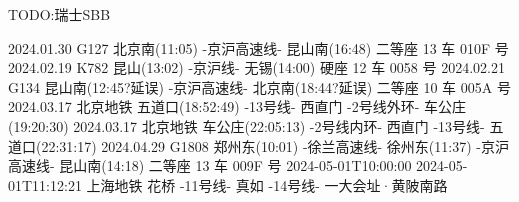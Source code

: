 TODO:瑞士SBB

2024.01.30 G127  北京南(11:05) -京沪高速线- 昆山南(16:48) 二等座 13 车 010F 号
2024.02.19 K782  昆山(13:02) -京沪线- 无锡(14:00) 硬座 12 车 0058 号
2024.02.21 G134  昆山南(12:45?延误) -京沪高速线- 北京南(18:44?延误) 二等座 10 车 005A 号
2024.03.17 北京地铁 五道口(18:52:49) -13号线- 西直门 -2号线外环- 车公庄(19:20:30)
2024.03.17 北京地铁 车公庄(22:05:13) -2号线内环- 西直门 -13号线- 五道口(22:31:17)
2024.04.29 G1808 郑州东(10:01) -徐兰高速线- 徐州东(11:37) -京沪高速线- 昆山南(14:18) 二等座 13 车 009F 号
2024-05-01T10:00:00 2024-05-01T11:12:21 上海地铁 花桥 -11号线- 真如 -14号线- 一大会址·黄陂南路
